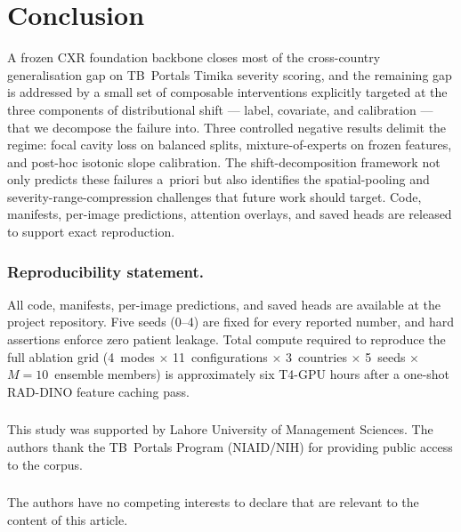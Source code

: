 \documentclass[runningheads]{llncs}
\begin{document}
\section{Conclusion}

A frozen CXR foundation backbone closes most of the cross-country generalisation gap on TB~Portals Timika severity scoring, and the remaining gap is addressed by a small set of composable interventions explicitly targeted at the three components of distributional shift --- label, covariate, and calibration --- that we decompose the failure into. Three controlled negative results delimit the regime: focal cavity loss on balanced splits, mixture-of-experts on frozen features, and post-hoc isotonic slope calibration. The shift-decomposition framework not only predicts these failures a~priori but also identifies the spatial-pooling and severity-range-compression challenges that future work should target. Code, manifests, per-image predictions, attention overlays, and saved heads are released to support exact reproduction.

\subsubsection*{Reproducibility statement.}
All code, manifests, per-image predictions, and saved heads are available at the project repository. Five seeds (0--4) are fixed for every reported number, and hard assertions enforce zero patient leakage. Total compute required to reproduce the full ablation grid (4~modes $\times$ 11~configurations $\times$ 3~countries $\times$ 5~seeds $\times$ $M{=}10$~ensemble members) is approximately six T4-GPU hours after a one-shot RAD-DINO feature caching pass.

\begin{credits}
\subsubsection{\ackname} This study was supported by Lahore University of Management Sciences. The authors thank the TB~Portals Program (NIAID/NIH) for providing public access to the corpus.

\subsubsection{\discintname}
The authors have no competing interests to declare that are relevant to the content of this article.
\end{credits}



\end{document}
